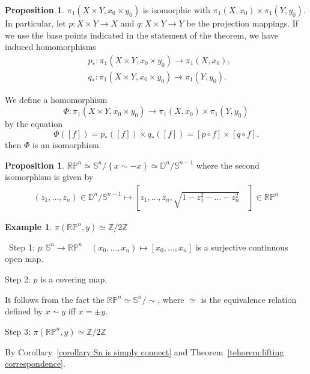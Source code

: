 \documentclass[12pt,a4paper]{book}
\newenvironment{prooff}{{\noindent\it\textcolor{cyan!40!black}{Proof}:}\,}{\par}
\newcommand{\bbrace}[1]{\left\{ #1 \right\} }
\newcommand{\bb}[1]{\mathbb{#1}}
\theoremstyle{definition}
\newtheorem{prop}[defn]{Proposition}
\newtheorem{exam}[defn]{Example}
\begin{document}
\begin{prop}
    $\pi_1\left(X \times Y, x_0 \times y_0\right)$ is isomorphic with $\pi_1\left(X, x_0\right) \times \pi_1\left(Y, y_0\right)$. In particular,
    let $p: X \times Y \rightarrow X$ and $q: X \times Y \rightarrow Y$ be the projection mappings. If we use the base points indicated in the statement of the theorem, we have induced homomorphisms
    $$
        \begin{aligned}
             & p_*: \pi_1\left(X \times Y, x_0 \times y_0\right) \longrightarrow \pi_1\left(X, x_0\right),  \\
             & q_*: \pi_1\left(X \times Y, x_0 \times y_0\right) \longrightarrow \pi_1\left(Y, y_0\right) .
        \end{aligned}
    $$

    We define a homomorphism
    $$
        \Phi: \pi_1\left(X \times Y, x_0 \times y_0\right) \longrightarrow \pi_1\left(X, x_0\right) \times \pi_1\left(Y, y_0\right)
    $$
    by the equation
    $$
        \Phi([f])=p_*([f]) \times q_*([f])=[p \circ f] \times[q \circ f] .
    $$
    then $\Phi$ is an isomorphism.
\end{prop}
\begin{prop}
    $\bb{R}\bb{P}^n\simeq \bb{S}^n/\bbrace{x\sim -x}\simeq \bb{D}^n/\bb{S}^{n-1}$
    where the second isomorphism is given by
    \begin{align*}
        (z_1,\dots,z_n) \in \bb{D}^n/\bb{S}^{n-1}\mapsto [z_1,\dots,z_n,\sqrt{1-z_1^2-\dots-z_n^2} \quad  ]\in \bb{R}\bb{P}^n
    \end{align*}
\end{prop}
\begin{exam}
    $\pi(\bb{R}\bb{P}^n,y)\simeq \bb{Z}/2\bb{Z}$
\end{exam}
\begin{prooff}
    Step 1: $p:\bb{S}^n\rightarrow \bb{R}\bb{P}^n \quad (x_0,\dots,x_n)\mapsto [x_0,\dots,x_n]$ is a surjective continuous open map.

    Step 2: $p$ is a covering map.

    It follows from the fact the $\bb{R}\bb{P}^n\simeq \bb{S}^n/\sim $, where $\simeq$ is the equivalence relation defined by $x\sim y$ iff $x=\pm y$.

    Step 3: $\pi(\bb{R}\bb{P}^n,y)\simeq \bb{Z}/2\bb{Z}$

    By Corollary~\ref{corollary:Sn is simply connect} and Theorem~\ref{tehorem:lifting correspondence}.
\end{prooff}
\end{document}
